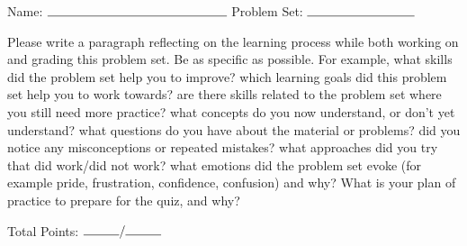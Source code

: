 \documentclass[11pt]{article}
\begin{document}

\hfill Name: $\rule{5cm}{.15mm}$\newline
{}\hfill Problem Set: $\rule{3cm}{.15mm}$




\vspace{1cm}
\Large{
Please write a paragraph reflecting on the learning process while both working on and grading this problem set. Be as specific as possible. For example, what skills did the problem set help you to improve? which learning goals did this problem set help you to work towards? are there skills related to the problem set where you still need more practice? what concepts do you now understand, or don't yet understand? what questions do you have about the material or problems? did you notice any misconceptions or repeated mistakes? what approaches did you try that did work/did not work? what emotions did the problem set evoke (for example pride, frustration, confidence, confusion) and why? What is your plan of practice to prepare for the quiz, and why?}

\vspace{16cm}
\noindent Total Points: $\rule{1cm}{0.15mm}/\rule{1cm}{0.15mm}$
\end{document}
